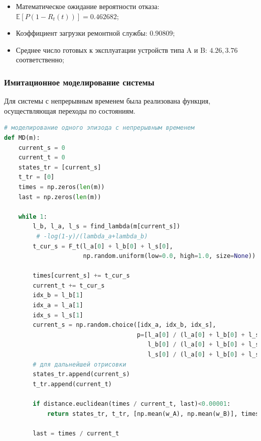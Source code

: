 \begin{itemize}
    \item Математическое ожидание вероятности отказа:
$\mathbb{E}[P(1-R_t(t))]=0.462682 $;
\item Коэффициент загрузки ремонтной службы: $0.90809$;
\item Среднее число готовых к эксплуатации устройств типа  A и B: $4.26, 3.76$ соответственно;
\end{itemize}

\subsubsection{Имитационное моделирование системы}

Для системы с непрерывным временем была реализована функция, осуществляющая переходы по состояниям.

\begin{lstlisting}[language=python, label=prog,caption={\textit{реализация марковского процесса}}]
# моделирование одного эпизода с непрерывным временем
def MD(m):
    current_s = 0
    current_t = 0
    states_tr = [current_s]
    t_tr = [0]
    times = np.zeros(len(m))
    last = np.zeros(len(m))

    while 1:
        l_b, l_a, l_s = find_lambda(m[current_s])
         # -log(1-y)/(lambda_a+lambda_b)
        t_cur_s = F_t(l_a[0] + l_b[0] + l_s[0],
                      np.random.uniform(low=0.0, high=1.0, size=None))

        times[current_s] += t_cur_s
        current_t += t_cur_s
        idx_b = l_b[1]
        idx_a = l_a[1]
        idx_s = l_s[1]
        current_s = np.random.choice([idx_a, idx_b, idx_s],
                                     p=[l_a[0] / (l_a[0] + l_b[0] + l_s[0]),
                                        l_b[0] / (l_a[0] + l_b[0] + l_s[0]),
                                        l_s[0] / (l_a[0] + l_b[0] + l_s[0])])
        # для дальнейшей отрисовки
        states_tr.append(current_s)
        t_tr.append(current_t)

        if distance.euclidean(times / current_t, last)<0.00001:
            return states_tr, t_tr, [np.mean(w_A), np.mean(w_B)], times / current_t, current_t

        last = times / current_t
\end{lstlisting}



